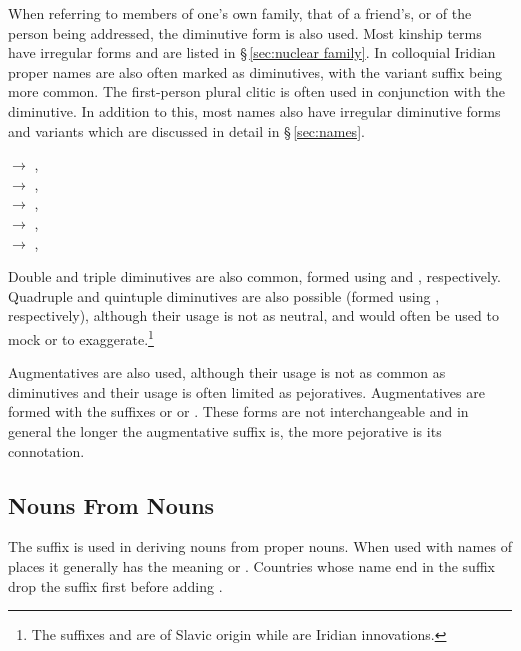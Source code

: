 When referring to members of one's own family, that of a friend's, or of the person being addressed, the diminutive form is also used. Most kinship terms have irregular forms and are listed in \S\,\ref{sec:nuclear family}. In colloquial Iridian proper names are also often marked as diminutives, with the variant suffix  being more common. The first-person plural clitic  is often used in conjunction with the diminutive. In addition to this, most names also have irregular diminutive forms and variants which are discussed in detail in \S\,\ref{sec:names}.

\ex
{} $\rightarrow$ , \\
 $\rightarrow$ , \\
 $\rightarrow$ , \\
 $\rightarrow$ , \\
 $\rightarrow$ , 
\xe

Double and triple diminutives are also common, formed using  and , respectively. Quadruple and quintuple diminutives are also possible (formed using  , respectively), although their usage is not as neutral, and would often be used to mock or to exaggerate.\footnote{The suffixes  and  are of Slavic origin while   are Iridian innovations.}

Augmentatives are also used, although their usage is not as common as diminutives and their usage is often limited as pejoratives. Augmentatives are formed with the suffixes  or  or . These forms are not interchangeable and in general the longer the augmentative suffix is, the more pejorative is its connotation.

\subsection{Nouns From Nouns}

The suffix  is used in deriving nouns from proper nouns. When used with names of places it generally has the meaning  or . Countries whose name end in the suffix  drop the suffix first before adding .

